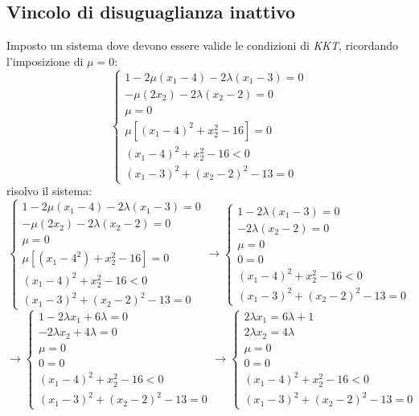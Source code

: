 \documentclass[a4paper,12pt, oneside]{book}
\begin{document}
\subsection{Vincolo di disuguaglianza inattivo}
Imposto un sistema dove devono essere valide le condizioni di
\textit{KKT}, ricordando l'imposizione di $\mu=0$: 
\[
  \begin{cases}
     1-2\mu(x_1-4)-2\lambda(x_1-3)=0\\
     -\mu(2x_2)-2\lambda(x_2-2)=0\\
     \mu=0\\
     \mu[(x_1-4)^2+x_2^2-16]=0\\
     (x_1-4)^2+x_2^2-16 < 0\\
     (x_1-3)^2+(x_2-2)^2-13=0
  \end{cases}
\]
risolvo il sistema:
\[
  \begin{cases}
    1-2\mu(x_1-4)-2\lambda(x_1-3)=0\\
    -\mu(2x_2)-2\lambda(x_2-2)=0\\
    \mu=0\\
    \mu[(x_1-4^2)+x_2^2-16]=0\\
    (x_1-4)^2+x_2^2-16 < 0\\
    (x_1-3)^2+(x_2-2)^2-13=0
  \end{cases}\to\begin{cases}
    1-2\lambda(x_1-3)=0\\
    -2\lambda(x_2-2)=0\\
    \mu=0\\
    0=0\\
    (x_1-4)^2+x_2^2-16 < 0\\
    (x_1-3)^2+(x_2-2)^2-13=0
  \end{cases}
\]
\[
  \to
  \begin{cases}
    1-2\lambda x_1+6\lambda=0\\
    -2\lambda x_2+4\lambda=0\\
    \mu=0\\
    0=0\\
    (x_1-4)^2+x_2^2-16 < 0\\
    (x_1-3)^2+(x_2-2)^2-13=0
  \end{cases}\to
  \begin{cases}
    2\lambda x_1=6\lambda+1\\
    2\lambda x_2=4\lambda\\
    \mu=0\\
    0=0\\
    (x_1-4)^2+x_2^2-16 < 0\\
    (x_1-3)^2+(x_2-2)^2-13=0
  \end{cases}
\]
\end{document}
